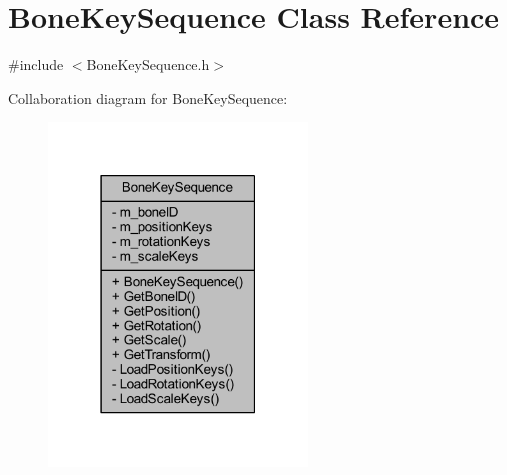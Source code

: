 \hypertarget{class_bone_key_sequence}{}\section{Bone\+Key\+Sequence Class Reference}
\label{class_bone_key_sequence}


{\ttfamily \#include $<$Bone\+Key\+Sequence.\+h$>$}



Collaboration diagram for Bone\+Key\+Sequence\+:\nopagebreak
\begin{figure}[H]
\begin{center}
\leavevmode
\includegraphics[width=195pt]{class_bone_key_sequence__coll__graph}
\end{center}
\end{figure}
